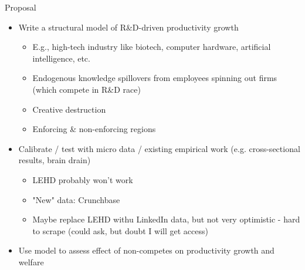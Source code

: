 \documentclass[english,usenames,dvipsnames]{beamer}
\begin{document}
\begin{frame}{Proposal}
\begin{itemize}
	\item Write a structural model of R\&D-driven productivity growth 
	\begin{itemize}
		\item E.g., high-tech industry like biotech, computer hardware, artificial intelligence, etc.
		\item Endogenous knowledge spillovers from employees spinning out firms (which compete in R\&D race)
		\item Creative destruction
		\item Enforcing \& non-enforcing regions
	\end{itemize}
	\item Calibrate / test with micro data / existing empirical work (e.g. cross-sectional results, brain drain)
	\begin{itemize}
		\item LEHD probably won't work
		\item "New" data: Crunchbase
		\item Maybe replace LEHD withu LinkedIn data, but not very optimistic - hard to scrape (could ask, but doubt I will get access)
	\end{itemize}
	\item Use model to assess effect of non-competes on productivity growth and welfare
\end{itemize}
\end{frame}
\end{document}
